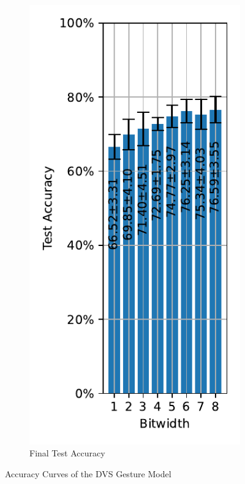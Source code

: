 \begin{figure}[H]
\begin{subfigure}[H]{0.3\textwidth}
                \includegraphics[width=\textwidth]{../standard/DVSGesture/plots/dvsgesture_final_acc.pdf}
                \caption{Final Test Accuracy}
            \end{subfigure}
            \caption{Accuracy Curves of the DVS Gesture Model}
        \end{figure}

